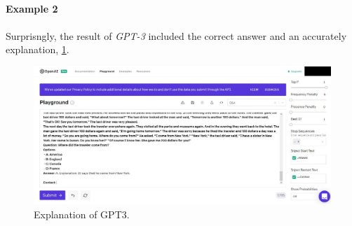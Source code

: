 \paragraph{Example 2}

\paragraph{}
Surprisngly, the result of \emph{GPT-3} included the correct answer and an accurately explanation, \ref{fig:gpt3-result-correct}.
\begin{figure}[h]
	\centering
	\includegraphics[scale=0.25]{images/gpt3-correct}
	\caption{Explanation of GPT3.}
	\label{fig:gpt3-result-correct}
\end{figure}
